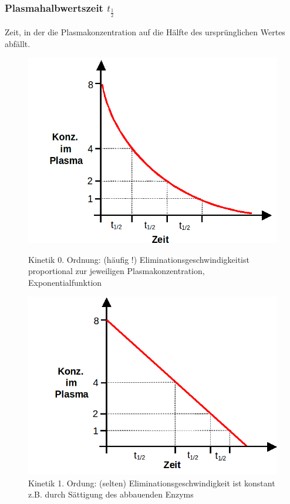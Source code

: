\documentclass[10pt,a4paper]{report}
\begin{document}
\subsubsection{Plasmahalbwertszeit $t_{\frac{1}{2}}$} Zeit, in der die Plasmakonzentration auf die Hälfte des ursprünglichen Wertes abfällt.
\begin{figure}[!htb]\centering
   \begin{minipage}{0.49\textwidth}
     \includegraphics[width=\linewidth]{kinetik0.png}
     \caption{Kinetik 0. Ordnung: (häufig !) Eliminationsgeschwindigkeitist proportional 	zur jeweiligen Plasmakonzentration, 
Exponentialfunktion}\label{Fig:kinetik0}
   \end{minipage}
   \begin {minipage}{0.49\textwidth}
     \includegraphics[width=\linewidth]{kinetik1.png}
     \caption{Kinetik 1. Ordung: (selten)
Eliminationsgeschwindigkeit ist konstant
z.B. durch Sättigung des abbauenden Enzyms}\label{Fig:kinetik1}
   \end{minipage}
\end{figure}
\end{document}
